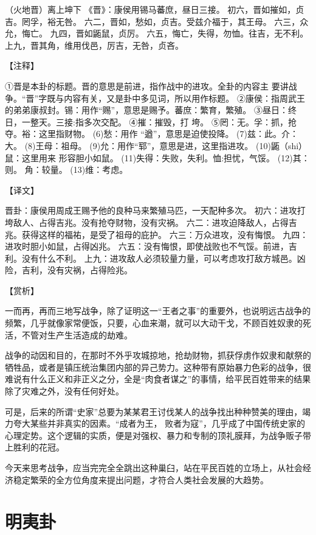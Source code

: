 \documentclass[12pt,UTF8]{ctexbook}
\begin{document}
（火地晋）离上坤下
《晋》：康侯用锡马蕃庶，昼日三接。
初六，晋如摧如，贞吉。罔孚，裕无咎。
六二，晋如，愁如，贞吉。受兹介福于，其王母。
六三，众允，悔亡。
九四，晋如鼫鼠，贞厉。
六五，悔亡，失得，勿恤。往吉，无不利。
上九，晋其角，维用伐邑，厉吉，无咎，贞吝。

【注释】

①晋是本卦的标题。晋的意思是前进，指作战中的进攻。全卦的内容主 要讲战争。“晋”字既与内容有关，又是卦中多见词，所以用作标题。
②康侯：指周武王的弟弟康叔封。锡：用作“赐”，意思是赐予。蕃庶：繁育，繁殖。
③昼日：终日，一整天。三接:指多次交配。
④摧：摧毁，打 垮。
⑤罔：无。孚：抓，抢夺。裕：这里指财物。
(6)愁：用作 “遒”，意思是迫使投降。
(7)兹：此。介：大。
(8)王母：祖母。
(9)允：用作“郓”，意思是进，这里指进攻。
(10)鼫（shi）鼠：这里用来 形容胆小如鼠。
(11)失得：失败，失利。恤:担忧，气馁。
(12)其：则。 角：较量。
(13)维：考虑。

【译文】

晋卦：康侯用周成王赐予他的良种马来繁殖马匹，一天配种多次。
初六：进攻打垮敌人、占得吉兆。没有抢夺财物，没有灾祸。
六二：进攻迫降敌人，占得吉兆。获得这样的福祐，是受了祖母的庇护。
六三：万众进攻，没有悔恨。
九四：进攻时胆小如鼠，占得凶兆。
六五：没有悔恨，即使战败也不气馁。前进，吉利。没有什么不利。
上九：进攻敌人必须较量力量，可以考虑攻打敌方城邑。凶险，吉利，没有灾祸，占得险兆。

【赏析】

一而再，再而三地写战争，除了证明这一“王者之事”的重要外，也说明远古战争的频繁，几乎就像家常便饭，只要，心血来潮，就可以大动干戈，不顾百姓奴隶的死活，不管对生产生活造成的劫难。

战争的动因和目的，在那时不外乎攻城掠地，抢劫财物，抓获俘虏作奴隶和献祭的牺牲品，或者是镇压统治集团内部的异己势力。这种带有原始暴力色彩的战争，很难说有什么正义和非正义之分，全是“肉食者谋之”的事情，给平民百姓带来的结果除了灾难之外，没有任何好处。

可是，后来的所谓“史家”总要为某某君王讨伐某人的战争找出种种赞美的理由，竭力夸大某些并非真实的因素。“成者为王， 败者为寇”，几乎成了中国传统史家的心理定势。这个逻辑的实质，便是对强权、暴力和专制的顶礼膜拜，为战争贩子带上胜利的花冠。

今天来思考战争，应当完完全全跳出这种巢臼，站在平民百姓的立场上，从社会经济稳定繁荣的全方位角度来提出问题，才符合人类社会发展的大趋势。

\chapter{明夷卦}
\end{document}
